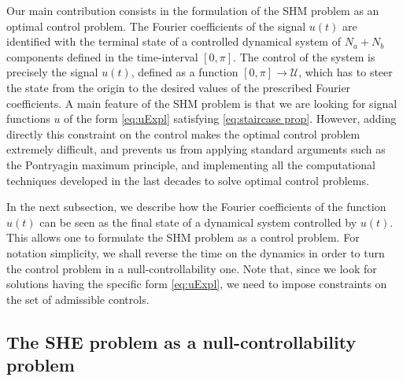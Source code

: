 \documentclass[twocolumn]{autart}    %
\begin{document}
Our main contribution consists in the formulation of the SHM problem as an optimal control problem. The Fourier coefficients of the signal $u(t)$ are identified with the terminal state of a controlled dynamical system of $N_a+N_b$ components defined in the time-interval $[0,\pi]$.  The control of the system is precisely the signal $u(t)$, defined as a function $[0,\pi]\to \mathcal{U}$, which has to steer the state from the origin to the desired values of the prescribed Fourier coefficients. A main feature of the SHM problem is that we are looking for signal functions $u$ of the form \eqref{eq:uExpl} satisfying \eqref{eq:staircase prop}. However, adding directly this constraint on the control makes the optimal control problem extremely difficult, and prevents us from applying standard arguments such as the Pontryagin maximum principle, and implementing all the computational techniques developed in the last decades to solve optimal control problems.

In the next subsection, we describe how the Fourier coefficients of the function $u(t)$ can be seen as the final state of a dynamical system controlled by $u(t)$. This allows one to formulate the SHM problem as a control problem. For notation simplicity, we shall reverse the time on the dynamics in order to turn the control problem in a null-controllability one. Note that, since we look for solutions having the specific form \eqref{eq:uExpl}, we need to impose constraints on the set of admissible controls.


\subsection{The SHE problem as  a null-controllability problem}\label{subsec:SHE as CP}
\end{document}
